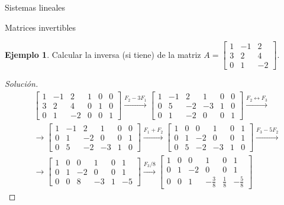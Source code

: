 \documentclass[a4paper,12pt,twoside,spanish,reqno]{amsbook}
\theoremstyle{definition}
\newtheorem{ejemplo}{Ejemplo}[section]
\theoremstyle{remark}
\begin{document}
\begin{chapter}{Sistemas lineales}
\begin{section}{Matrices invertibles}
            \begin{ejemplo}
                Calcular la inversa (si tiene) de la matriz $A=\begin{bmatrix}
                1&-1&2\\ 3&2&4\\ 0&1&-2
                \end{bmatrix}$. 
            \end{ejemplo}
            \begin{proof}[Solución]
                \begin{align*} 
                &\left[\begin{array}{rrr|rrr}	1&-1&2&1&0&0\\ 3&2&4&0&1&0\\ 0&1&-2&0&0&1 \end{array}\right]
                \stackrel{F_2-3 F_1}{\longrightarrow}
                \left[\begin{array}{rrr|rrr}	1&-1&2
                &1&0&0\\ 0&5&-2&-3&1&0\\ 0&1&-2&0&0&1 \end{array}\right]
                \stackrel{F_2\leftrightarrow F_3}{\longrightarrow} \\
                &\longrightarrow 
                \left[\begin{array}{rrr|rrr}	1&-1&2&1&0&0\\ 0&1&-2&0&0&1 \\ 0&5&-2&-3&1&0 \end{array}\right]
                \stackrel{F_1 + F_2}{\longrightarrow}
                \left[\begin{array}{rrr|rrr}	1&0&0&1&0&1\\ 0&1&-2&0&0&1 \\ 0&5&-2&-3&1&0 \end{array}\right]
                \stackrel{F_3-5F_2}{\longrightarrow} \\
                &\longrightarrow
                \left[\begin{array}{rrr|rrr}	1&0&0&1&0&1\\ 0&1&-2&0&0&1 \\ 0&0&8&-3&1&-5 \end{array}\right]
                \stackrel{F_3/8}{\longrightarrow}
                \left[\begin{array}{rrr|rrr}	1&0&0&1&0&1\\ 0&1&-2&0&0&1 \\ 0&0&1&-\frac38&\frac18&-\frac58 \end{array}\right]

\end{align*}
\end{proof}
\end{section}
\end{chapter}
\end{document}
